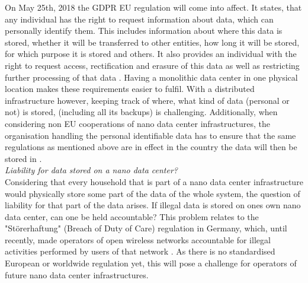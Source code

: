 
On May 25th, 2018 the GDPR EU regulation will come into affect. It states, that any individual has the right to request information about data, which can personally identify them. This includes information about where this data is stored, whether it will be transferred to other entities, how long it will be stored, for which purpose it is stored and others. It also provides an individual with the right to request access, rectification and erasure of this data as well as restricting further processing of that data \cite{gdpr3}. Having a monolithic data center in one physical location makes these requirements easier to fulfil. With a distributed infrastructure however, keeping track of where, what kind of data (personal or not) is stored, (including all its backups) is challenging. Additionally, when considering non EU cooperations of nano data center infrastructures, the organisation handling the personal identifiable data has to ensure that the same regulations as mentioned above are in effect in the country the data will then be stored in \cite{gdpr5}.\\

\textit{Liability for data stored on a nano data center?}\\
Considering that every household that is part of a nano data center infrastructure would physically store some part of the data of the whole system, the question of liability for that part of the data arises. If illegal data is stored on ones own nano data center, can one be held accountable? This problem relates to the "Störerhaftung" (Breach of Duty of Care) regulation in Germany, which, until recently, made operators of open wireless networks accountable for illegal activities performed by users of that network \cite{bgb}. As there is no standardised European or worldwide regulation yet, this will pose a challenge for operators of future nano data center infrastructures.
